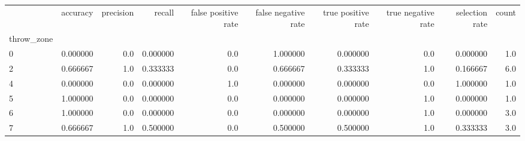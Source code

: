 \begin{tabular}{lrrrrrrrrr}
\toprule
{} &  accuracy &  precision &    recall &  false positive rate &  false negative rate &  true positive rate &  true negative rate &  selection rate &  count \\
throw\_zone &           &            &           &                      &                      &                     &                     &                 &        \\
\midrule
0          &  0.000000 &        0.0 &  0.000000 &                  0.0 &             1.000000 &            0.000000 &                 0.0 &        0.000000 &    1.0 \\
2          &  0.666667 &        1.0 &  0.333333 &                  0.0 &             0.666667 &            0.333333 &                 1.0 &        0.166667 &    6.0 \\
4          &  0.000000 &        0.0 &  0.000000 &                  1.0 &             0.000000 &            0.000000 &                 0.0 &        1.000000 &    1.0 \\
5          &  1.000000 &        0.0 &  0.000000 &                  0.0 &             0.000000 &            0.000000 &                 1.0 &        0.000000 &    1.0 \\
6          &  1.000000 &        0.0 &  0.000000 &                  0.0 &             0.000000 &            0.000000 &                 1.0 &        0.000000 &    3.0 \\
7          &  0.666667 &        1.0 &  0.500000 &                  0.0 &             0.500000 &            0.500000 &                 1.0 &        0.333333 &    3.0 \\
\bottomrule
\end{tabular}

